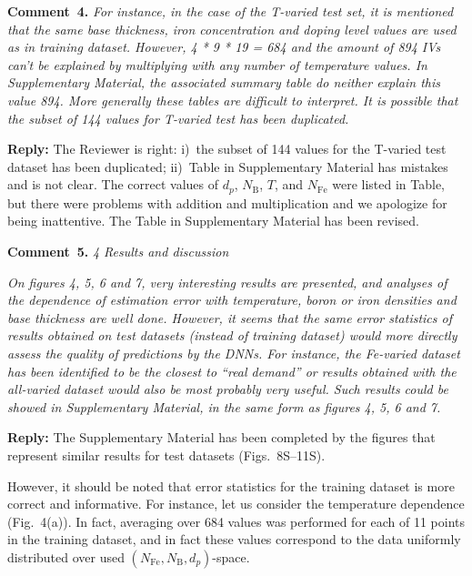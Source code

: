 \documentclass[num-refs]{wiley-article} %
\begin{document}
\vspace{1cm}
\noindent
\textcolor[rgb]{0.00,0.50,1.00}{\textbf{Comment~4.}}
\emph{
For instance, in the case of the T-varied test set, it is mentioned that the same base thickness,
iron concentration and doping level values are used as in training dataset.
However, 4 * 9 * 19 = 684 and the amount of 894 IVs can’t be explained by multiplying with any number of temperature values.
In Supplementary Material, the associated summary table do neither explain this value 894. More generally these tables are difficult to interpret. It is possible that the subset of 144 values for T-varied test has been duplicated. }

\vspace{0.5cm}
\noindent
\textcolor[rgb]{0.51,0.00,0.00}{\textbf{Reply:}}
The Reviewer is  right:
i)~the subset of 144 values for the T-varied test dataset has been duplicated;
ii)~Table in Supplementary Material has mistakes and is not clear.
The correct values of $d_p$, $N_\mathrm{B}$, $T$, and $N_{\mathrm{Fe}}$ were listed in Table,
but there were problems with addition and multiplication
and we apologize for being inattentive.
The Table in Supplementary Material has been revised.


\vspace{1cm}
\noindent
\textcolor[rgb]{0.00,0.50,1.00}{\textbf{Comment~5.}}
\emph{4 Results and discussion}

\emph{
On figures 4, 5, 6 and 7, very interesting results are presented,
and analyses of the dependence of estimation
error with temperature, boron or iron densities and base thickness are well done.
However, it seems that the same error statistics of results obtained on test datasets
(instead of training dataset) would more directly assess the quality of predictions by the DNNs.
For instance, the Fe-varied dataset has been identified to be
the closest to “real demand” or results obtained with the all-varied dataset
would also be most probably very useful.
Such results could be showed in Supplementary Material, in the same form as figures 4, 5, 6 and 7. }

\vspace{0.5cm}
\noindent
\textcolor[rgb]{0.51,0.00,0.00}{\textbf{Reply:}}
The Supplementary Material has been completed by the figures
that  represent similar results for test datasets (Figs.~8S--11S).

However, it should be noted that error statistics for the training dataset is more correct and informative.
For instance, let us consider the temperature dependence (Fig.~4(a)).
In fact, averaging over 684 values was performed for each of 11 points in the training dataset,
and in fact these values correspond to the data uniformly distributed over used $(N_\mathrm{Fe},N_\mathrm{B},d_p)$-space.
\end{document}
